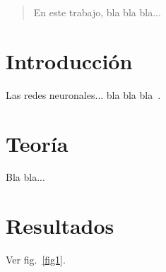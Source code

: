 \documentclass[aps,prl,twocolumn,groupedaddress]{revtex4-2}
\begin{document}
\begin{abstract}
En este trabajo, bla bla bla...
\end{abstract}


\maketitle

\section{Introducción}

Las redes neuronales... bla bla bla~\cite{hertz1999introduction}.

\section{Teoría}

Bla bla...

\section{Resultados}

Ver fig.~\ref{fig1}.
\end{document}
